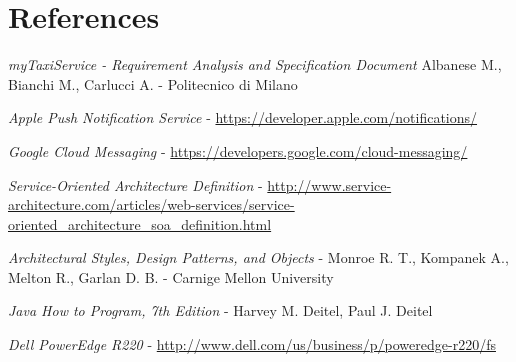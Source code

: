 \pagebreak
\section{References}
\begin{thebibliography}{9}

    \emph{myTaxiService - Requirement Analysis and Specification Document}
    Albanese M., Bianchi M., Carlucci A. - Politecnico di Milano

    \emph{Apple Push Notification Service} -
    \url{https://developer.apple.com/notifications/}

    \emph{Google Cloud Messaging} - 
    \url{https://developers.google.com/cloud-messaging/}

    \emph{Service-Oriented Architecture Definition} - 
    \url{http://www.service-architecture.com/articles/web-services/service-oriented_architecture_soa_definition.html}

    \emph{Architectural Styles, Design Patterns, and Objects} - 
    Monroe R. T., Kompanek A., Melton R., Garlan D. B. - 
    Carnige Mellon University
    
	\emph{Java How to Program, 7th Edition} - 
	Harvey M. Deitel, Paul J. Deitel

    \emph{Dell PowerEdge R220} -
    \url{http://www.dell.com/us/business/p/poweredge-r220/fs}

\end{thebibliography}
